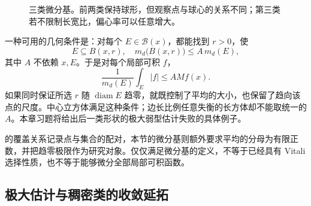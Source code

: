 \begin{figure}[htbp]
\centering
{}
\caption[三类微分基]{三类微分基。前两类保持球形，但观察点与球心的关系不同；第三类若不限制长宽比，偏心率可以任意增大。}
\label{b1:fig:differentiation-bases}
\end{figure}

一种可用的几何条件是：对每个 \(E\in\mathcal B(x)\)，都能找到 \(r>0\)，使
\begin{equation}\label{b1:eq:basis-volume-comparison}
 E\subseteq B(x,r),\quad m_d\bigl(B(x,r)\bigr)\leq A\,m_d(E),
\end{equation}
其中 \(A\) 不依赖 \(x,E\)。于是对每个局部可积 \(f\)，
\[
 \frac1{m_d(E)}\int_E|f|\leq A Mf(x).
\]
如果同时保证所选 \(r\) 随 \(\operatorname{diam}E\) 趋零，就既控制了平均的大小，也保留了趋向该点的尺度。中心立方体满足这种条件；边长比例任意失衡的长方体却不能取统一的 \(A\)。本章习题将给出后一类形状的极大弱型估计失败的具体例子。

\ProseParagraphBreak

的覆盖关系记录点与集合的配对，本节的微分基则额外要求平均的分母为有限正数，并把趋零极限作为研究对象。仅仅满足微分基的定义，不等于已经具有 Vitali 选择性质，也不等于能够微分全部局部可积函数。

\subsection{极大估计与稠密类的收敛延拓}
\label{b1:subsec:130402}

